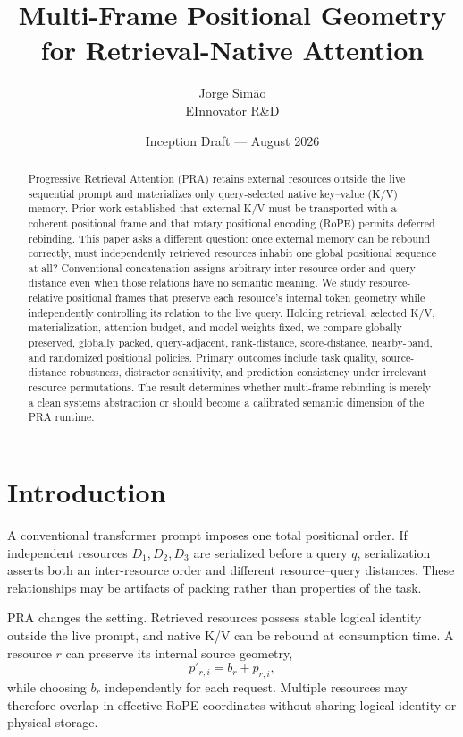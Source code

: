 \documentclass[10pt]{article}
\title{Multi-Frame Positional Geometry for Retrieval-Native Attention}
\author{Jorge Sim\~ao\\EInnovator R\&D}
\date{Inception Draft --- August 2026}
\begin{document}
\maketitle

\begin{abstract}
Progressive Retrieval Attention (PRA) retains external resources outside the live sequential prompt and materializes only query-selected native key--value (K/V) memory. Prior work established that external K/V must be transported with a coherent positional frame and that rotary positional encoding (RoPE) permits deferred rebinding. This paper asks a different question: once external memory can be rebound correctly, must independently retrieved resources inhabit one global positional sequence at all? Conventional concatenation assigns arbitrary inter-resource order and query distance even when those relations have no semantic meaning. We study resource-relative positional frames that preserve each resource's internal token geometry while independently controlling its relation to the live query. Holding retrieval, selected K/V, materialization, attention budget, and model weights fixed, we compare globally preserved, globally packed, query-adjacent, rank-distance, score-distance, nearby-band, and randomized positional policies. Primary outcomes include task quality, source-distance robustness, distractor sensitivity, and prediction consistency under irrelevant resource permutations. The result determines whether multi-frame rebinding is merely a clean systems abstraction or should become a calibrated semantic dimension of the PRA runtime.
\end{abstract}

\section{Introduction}
A conventional transformer prompt imposes one total positional order. If independent resources $D_1,D_2,D_3$ are serialized before a query $q$, serialization asserts both an inter-resource order and different resource--query distances. These relationships may be artifacts of packing rather than properties of the task.

PRA changes the setting. Retrieved resources possess stable logical identity outside the live prompt, and native K/V can be rebound at consumption time. A resource $r$ can preserve its internal source geometry,
\[
p'_{r,i}=b_r+p_{r,i},
\]
while choosing $b_r$ independently for each request. Multiple resources may therefore overlap in effective RoPE coordinates without sharing logical identity or physical storage.
\end{document}
